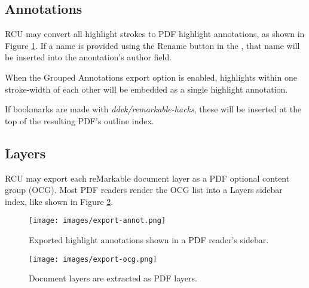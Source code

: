 \subsection{Annotations}
\label{sec:hltannot}
RCU may convert all highlight strokes to PDF highlight annotations, as shown in Figure \ref{fig:highlightannot}. If a name is provided using the Rename button in the , that name will be inserted into the anontation's author field.

When the Grouped Annotations export option is enabled, highlights within one stroke-width of each other will be embedded as a single highlight annotation.

If bookmarks are made with \textit{ddvk/remarkable-hacks}, these will be inserted at the top of the resulting PDF's outline index.


\subsection{Layers}
RCU may export each reMarkable document layer as a PDF optional content group (OCG). Most PDF readers render the OCG list into a Layers sidebar index, like shown in Figure \ref{fig:pdfocg}.


\mbox{}
\vfill

\begin{figure}[h]
  \texttt{[image: images/export-annot.png]}
\caption{Exported highlight annotations shown in a PDF reader's sidebar.}
\label{fig:highlightannot}
\end{figure}

\vfill

\begin{figure}[h]
  \centering
  \texttt{[image: images/export-ocg.png]}
\caption{Document layers are extracted as PDF layers.}
\label{fig:pdfocg}
\end{figure}

\vfill
